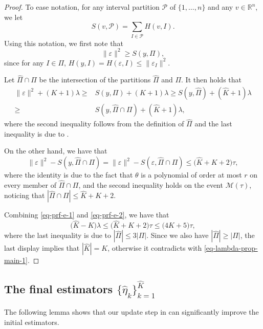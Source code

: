\documentclass{article}
\begin{document}
\begin{proof}
To ease notation, for any interval partition $\mathcal{P}$ of $\{1, \ldots, n\}$ and any $v \in \mathbb{R}^n$, we let
	\[
		S(v, \mathcal{P}) = \sum_{I \in \mathcal{P}} H(v, I).
	\]
	Using this notation, we first note that
	\[
		\|\varepsilon\|^2 \geq S(y, \Pi),
	\] 
	since for any $I \in \Pi$, $H(y, I) = H(\varepsilon, I) \leq \|\varepsilon_I\|^2$.  

Let $\widehat{\Pi} \cap \Pi$	 be the intersection of the partitions $\widehat{\Pi}$ and $\Pi$.  It then holds that
	\begin{align}
		\|\varepsilon\|^2 + (K + 1) \lambda \geq & S(y, \Pi) + (K + 1) \lambda \geq S(y, \widehat{\Pi}) + (\widehat{K} + 1) \lambda \nonumber \\ 
		\geq & S(y, \widehat{\Pi} \cap \Pi) + (\widehat{K} + 1) \lambda, \label{eq-prf-e-1}
	\end{align}
	where the second inequality follows from the definition of $\widehat{\Pi}$ and the last inequality is due to . 
	
On the other hand, we have that
	\begin{equation}\label{eq-prf-e-2}
		\|\varepsilon\|^2 - S(y, \widehat{\Pi} \cap \Pi) = \|\varepsilon\|^2 - S(\varepsilon, \widehat{\Pi} \cap \Pi) \leq \big(\widehat{K} + K + 2\big) \tau,
	\end{equation}
	where the identity is due to the fact that $\theta$ is a polynomial of order at most $r$ on every member of $\widehat{\Pi} \cap \Pi$, and the second inequality holds on the event $\mathcal{M}(\tau)$, noticing that $|\widehat{\Pi} \cap \Pi| \leq \widehat{K} + K + 2$.
	
Combining \eqref{eq-prf-e-1} and \eqref{eq-prf-e-2}, we have that		
	\[
		\big(\widehat{K} - K\big) \lambda \leq \big(\widehat{K} + K + 2\big) \tau \leq \big(4K + 5\big) \tau,
	\]
	where the last inequality is due to $|\widehat{\Pi}| \leq 3|\Pi|$.  Since we also have $|\widehat{\Pi}| \geq |\Pi|$, the last display implies that $|\widehat{K}| = K$, otherwise it contradicts with \eqref{eq-lambda-prop-main-1}.
\end{proof}


\subsection{The final estimators $\{\widehat{\eta}_k\}_{k = 1}^{\widehat{K}}$}

The following lemma shows that our update step in  can significantly improve the initial estimators.
\end{document}
